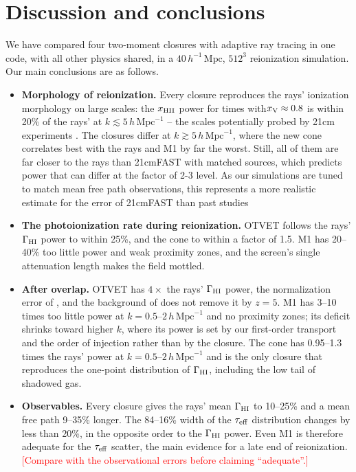 \documentclass[iop]{openjournal}
\newcommand{\hmpc}{\,h\,\mathrm{Mpc}^{-1}}
\newcommand{\mpch}{\,h^{-1}\,\mathrm{Mpc}}
\newcommand{\xv}{x_{\rm V}}
\begin{document}
\section{Discussion and conclusions}\label{sec:conclusions}
We have compared four two-moment closures with adaptive ray tracing in one code, with all other physics shared, in a $40\mpch$, $512^3$ reionization simulation. Our main conclusions are as follows.
\begin{itemize}
\item \textbf{Morphology of reionization.} Every closure reproduces the rays' ionization morphology on large scales: the $x_{\rm HII}$ power for times with$\xv\approx0.8$ is within 20\% of the rays' at $k\lesssim 5\hmpc$ -- the scales potentially probed by 21cm experiments \citep{Furlanetto2006,deboer17}. The closures differ at $k\gtrsim5\hmpc$, where the new cone correlates best with the rays and M1 by far the worst. Still, all of them are far closer to the rays than 21cmFAST with matched sources, which predicts power that can differ at the factor of 2-3 level.  As our simulations are tuned to match mean free path observations, this represents a more realistic estimate for the error of 21cmFAST than past studies 
\item \textbf{The photoionization rate during reionization.} OTVET follows the rays' $\Gamma_{\rm HI}$ power to within 25\%, and the cone to within a factor of 1.5. M1 has 20--40\% too little power and weak proximity zones, and the screen's single attenuation length makes the field mottled.
\item \textbf{After overlap.} OTVET has $4\times$ the rays' $\Gamma_{\rm HI}$ power, the normalization error of \citet{wu21}, and the background of \citet{gnedin01} does not remove it by $z=5$. M1 has 3--10 times too little power at $k=0.5$--$2\hmpc$ and no proximity zones; its deficit shrinks toward higher $k$, where its power is set by our first-order transport and the order of injection rather than by the closure. The cone has 0.95--1.3 times the rays' power at $k=0.5$--$2\hmpc$ and is the only closure that reproduces the one-point distribution of $\Gamma_{\rm HI}$, including the low tail of shadowed gas.
\item \textbf{Observables.} Every closure gives the rays' mean $\Gamma_{\rm HI}$ to 10--25\% and a mean free path 9--35\% longer. The 84--16\% width of the $\tau_{\rm eff}$ distribution changes by less than 20\%, in the opposite order to the $\Gamma_{\rm HI}$ power. Even M1 is therefore adequate for the $\tau_{\rm eff}$ scatter, the main evidence for a late end of reionization. \textcolor{red}{[Compare with the observational errors before claiming ``adequate''.]}

\end{itemize}
\end{document}
